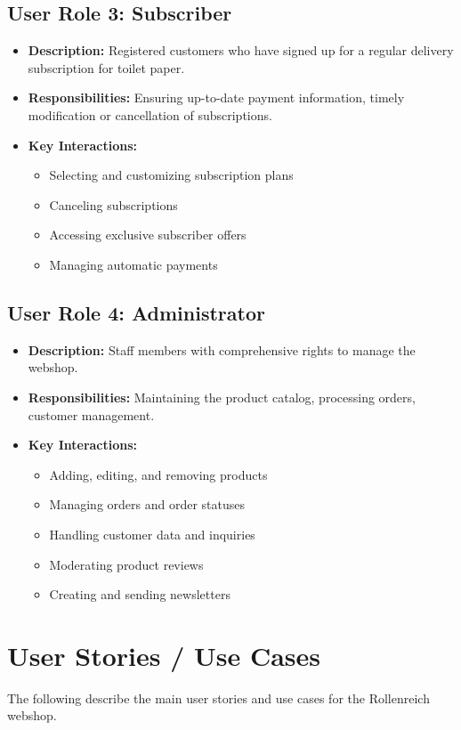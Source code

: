 \documentclass[a4paper,11pt]{article}
\begin{document}
\subsection{User Role 3: Subscriber}
\begin{itemize}
    \item \textbf{Description:} Registered customers who have signed up for a regular delivery subscription for toilet paper.
    \item \textbf{Responsibilities:} Ensuring up-to-date payment information, timely modification or cancellation of subscriptions.
    \item \textbf{Key Interactions:}
    \begin{itemize}
        \item Selecting and customizing subscription plans
        \item Canceling subscriptions
        \item Accessing exclusive subscriber offers
        \item Managing automatic payments
    \end{itemize}
\end{itemize}

\subsection{User Role 4: Administrator}
\begin{itemize}
    \item \textbf{Description:} Staff members with comprehensive rights to manage the webshop.
    \item \textbf{Responsibilities:} Maintaining the product catalog, processing orders, customer management.
    \item \textbf{Key Interactions:}
    \begin{itemize}
        \item Adding, editing, and removing products
        \item Managing orders and order statuses
        \item Handling customer data and inquiries
        \item Moderating product reviews
        \item Creating and sending newsletters
    \end{itemize}
\end{itemize}

\newpage
\section{User Stories / Use Cases}
The following describe the main user stories and use cases for the Rollenreich webshop.
\end{document}
